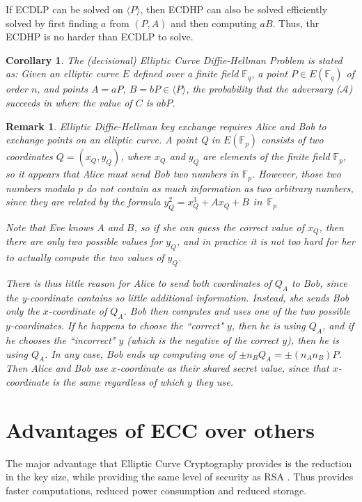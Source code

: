 \documentclass[a4paper,12pt]{report}
\newtheorem{remark}{Remark}
\newtheorem{corollary}{Corollary}
\begin{document}
If ECDLP can be solved on $\langle P \rangle$, then ECDHP can also
be solved efficiently solved by first finding $a$ from $(P, A)$ and
then computing $aB$. Thus, thr ECDHP is no harder than ECDLP to
solve.

\begin{corollary}
The (decisional) Elliptic Curve Diffie-Hellman Problem is stated as:
Given an elliptic curve $E$ defined over a finite field
$\mathbb{F}_q$, a point $P \in E(\mathbb{F}_q)$ of order $n$, and
points $A = aP$, $B = bP \in \langle P \rangle$, the probability
that the adversary ($\mathcal{A}$) succeeds in where the value of
$C$ is $abP$.
\end{corollary}

\begin{remark}
Elliptic Diffie-Hellman key exchange requires Alice and Bob to
exchange points on an elliptic curve. A point Q in $E(\mathbb{F}_p)$
consists of two coordinates $Q = (x_Q, y_Q)$, where $x_Q$ and $y_Q$
are elements of the finite field $\mathbb{F}_p$, so it appears that
Alice must send Bob two numbers in $\mathbb{F}_p$. However, those
two numbers modulo $p$ do not contain as much information as two
arbitrary numbers, since they are related by the formula $y_Q^2 =
x_Q^3 + Ax_Q +B \  \ in  \ \ \mathbb{F}_p$

Note that Eve knows $A$ and $B$, so if she can guess the correct
value of $x_Q$, then there are only two possible values for $y_Q$,
and in practice it is not too hard for her to actually compute the
two values of $y_Q$.

There is thus little reason for Alice to send both coordinates of
$Q_A$ to Bob, since the y-coordinate contains so little additional
information. Instead, she sends Bob only the $x$-coordinate of
$Q_A$. Bob then computes and uses one of the two possible
$y$-coordinates. If he happens to choose the ``correct" $y$, then he
is using $Q_A$, and if he chooses the ``incorrect" $y$ (which is the
negative of the correct $y$), then he is using $Q_A$. In any case,
Bob ends up computing one of $\pm n_B Q_A = \pm (n_A n_B)P$. Then
Alice and Bob use $x$-coordinate as their shared secret value, since
that $x$-coordinate is the same regardless of which $y$ they use.
\end{remark}

\section{Advantages of ECC over others}
The major advantage that Elliptic Curve Cryptography provides is the
reduction in the key size, while providing the same level of security
as RSA \cite{lenstra}. Thus provides faster computations, reduced
power consumption and reduced storage.
\end{document}
